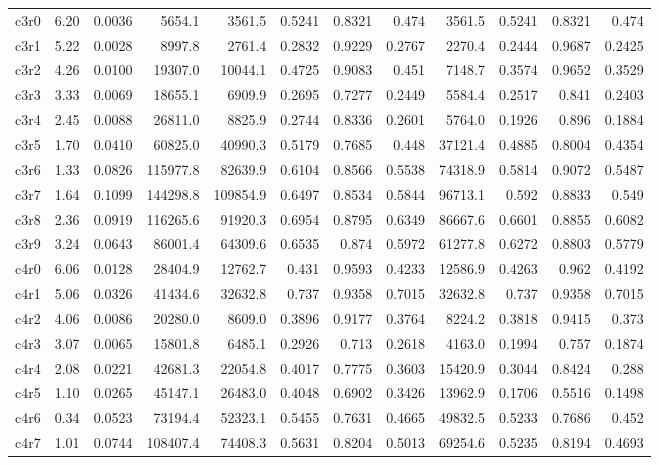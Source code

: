 \begin{landscape}
\begin{longtable}[]{@{}lrrrrrrrrrrr@{}}
c3r0 & 6.20 & 0.0036 & 5654.1 & 3561.5 & 0.5241 & 0.8321 & 0.474 & 3561.5 & 0.5241 & 0.8321 & 0.474 \\
c3r1 & 5.22 & 0.0028 & 8997.8 & 2761.4 & 0.2832 & 0.9229 & 0.2767 & 2270.4 & 0.2444 & 0.9687 & 0.2425 \\
c3r2 & 4.26 & 0.0100 & 19307.0 & 10044.1 & 0.4725 & 0.9083 & 0.451 & 7148.7 & 0.3574 & 0.9652 & 0.3529 \\
c3r3 & 3.33 & 0.0069 & 18655.1 & 6909.9 & 0.2695 & 0.7277 & 0.2449 & 5584.4 & 0.2517 & 0.841 & 0.2403 \\
c3r4 & 2.45 & 0.0088 & 26811.0 & 8825.9 & 0.2744 & 0.8336 & 0.2601 & 5764.0 & 0.1926 & 0.896 & 0.1884 \\
c3r5 & 1.70 & 0.0410 & 60825.0 & 40990.3 & 0.5179 & 0.7685 & 0.448 & 37121.4 & 0.4885 & 0.8004 & 0.4354 \\
c3r6 & 1.33 & 0.0826 & 115977.8 & 82639.9 & 0.6104 & 0.8566 & 0.5538 & 74318.9 & 0.5814 & 0.9072 & 0.5487 \\
c3r7 & 1.64 & 0.1099 & 144298.8 & 109854.9 & 0.6497 & 0.8534 & 0.5844 & 96713.1 & 0.592 & 0.8833 & 0.549 \\
c3r8 & 2.36 & 0.0919 & 116265.6 & 91920.3 & 0.6954 & 0.8795 & 0.6349 & 86667.6 & 0.6601 & 0.8855 & 0.6082 \\
c3r9 & 3.24 & 0.0643 & 86001.4 & 64309.6 & 0.6535 & 0.874 & 0.5972 & 61277.8 & 0.6272 & 0.8803 & 0.5779 \\
c4r0 & 6.06 & 0.0128 & 28404.9 & 12762.7 & 0.431 & 0.9593 & 0.4233 & 12586.9 & 0.4263 & 0.962 & 0.4192 \\
c4r1 & 5.06 & 0.0326 & 41434.6 & 32632.8 & 0.737 & 0.9358 & 0.7015 & 32632.8 & 0.737 & 0.9358 & 0.7015 \\
c4r2 & 4.06 & 0.0086 & 20280.0 & 8609.0 & 0.3896 & 0.9177 & 0.3764 & 8224.2 & 0.3818 & 0.9415 & 0.373 \\
c4r3 & 3.07 & 0.0065 & 15801.8 & 6485.1 & 0.2926 & 0.713 & 0.2618 & 4163.0 & 0.1994 & 0.757 & 0.1874 \\
c4r4 & 2.08 & 0.0221 & 42681.3 & 22054.8 & 0.4017 & 0.7775 & 0.3603 & 15420.9 & 0.3044 & 0.8424 & 0.288 \\
c4r5 & 1.10 & 0.0265 & 45147.1 & 26483.0 & 0.4048 & 0.6902 & 0.3426 & 13962.9 & 0.1706 & 0.5516 & 0.1498 \\
c4r6 & 0.34 & 0.0523 & 73194.4 & 52323.1 & 0.5455 & 0.7631 & 0.4665 & 49832.5 & 0.5233 & 0.7686 & 0.452 \\
c4r7 & 1.01 & 0.0744 & 108407.4 & 74408.3 & 0.5631 & 0.8204 & 0.5013 & 69254.6 & 0.5235 & 0.8194 & 0.4693 \\

\end{longtable}
\end{landscape}
